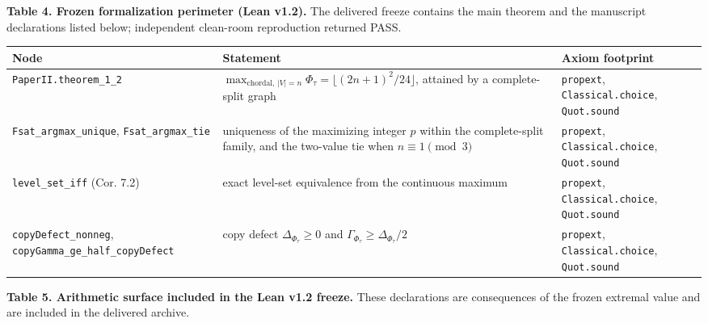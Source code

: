 \documentclass[
  american,
  11pt,
  a4paper,
]{article}
\newcounter{none} %
\begin{document}
\textbf{Table 4. Frozen formalization perimeter (Lean v1.2).} The delivered freeze contains the main theorem and the manuscript declarations listed below; independent clean-room reproduction returned PASS.

{\def\LTcaptype{none} %
\begin{longtable}[]{@{}
  >{\raggedright\arraybackslash}p{}
  >{\raggedright\arraybackslash}p{}
  >{\raggedright\arraybackslash}p{}@{}}
\toprule\noalign{}
\begin{minipage}[b]{\linewidth}\raggedright
Node
\end{minipage} & \begin{minipage}[b]{\linewidth}\raggedright
Statement
\end{minipage} & \begin{minipage}[b]{\linewidth}\raggedright
Axiom footprint
\end{minipage} \\
\midrule\noalign{}
\endhead
\bottomrule\noalign{}
\endlastfoot
\texttt{PaperII.theorem\_1\_2} & \(\max_{\text{chordal},\,|V|=n}\Phi_\tau=\lfloor(2n+1)^2/24\rfloor\), attained by a complete-split graph & \texttt{propext}, \texttt{Classical.choice}, \texttt{Quot.sound} \\
\texttt{Fsat\_argmax\_unique}, \texttt{Fsat\_argmax\_tie} & uniqueness of the maximizing integer \(p\) within the complete-split family, and the two-value tie when \(n\equiv1\pmod3\) & \texttt{propext}, \texttt{Classical.choice}, \texttt{Quot.sound} \\
\texttt{level\_set\_iff} (Cor. 7.2) & exact level-set equivalence from the continuous maximum & \texttt{propext}, \texttt{Classical.choice}, \texttt{Quot.sound} \\
\texttt{copyDefect\_nonneg}, \texttt{copyGamma\_ge\_half\_copyDefect} & copy defect \(\Delta_{\Phi_\tau}\ge0\) and \(\Gamma_{\Phi_\tau}\ge\Delta_{\Phi_\tau}/2\) & \texttt{propext}, \texttt{Classical.choice}, \texttt{Quot.sound} \\
\end{longtable}
}

\textbf{Table 5. Arithmetic surface included in the Lean v1.2 freeze.} These declarations are consequences of the frozen extremal value and are included in the delivered archive.
\end{document}
